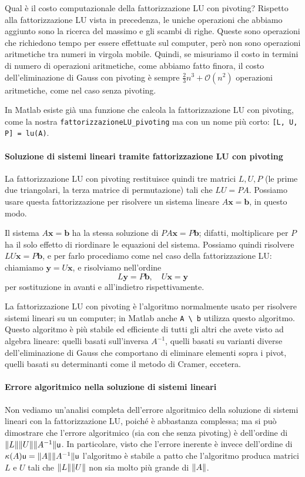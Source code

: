 \documentclass[a4paper]{report}
\DeclarePairedDelimiter{\norm}{\lVert}{\rVert}
\theoremstyle{definition}
\theoremstyle{remark}
\newcommand{\x}{\mathbf{x}}
\renewcommand{\b}{\mathbf{b}}
\begin{document}
Qual è il costo computazionale della fattorizzazione LU con pivoting? Rispetto alla fattorizzazione LU vista in precedenza, le uniche operazioni che abbiamo aggiunto sono la ricerca del massimo e gli scambi di righe. Queste sono operazioni che richiedono tempo per essere effettuate sul computer, però non sono operazioni aritmetiche tra numeri in virgola mobile. Quindi, se misuriamo il costo in termini di numero di operazioni aritmetiche, come abbiamo fatto finora, il costo dell'eliminazione di Gauss con pivoting è sempre $\frac23 n^3 + \mathcal{O}(n^2)$ operazioni aritmetiche, come nel caso senza pivoting.

In Matlab esiste già una funzione che calcola la fattorizzazione LU con pivoting, come la nostra \lstinline{fattorizzazioneLU_pivoting} ma con un nome più corto: \lstinline{[L, U, P] = lu(A)}.


\paragraph{Soluzione di sistemi lineari tramite fattorizzazione LU con pivoting}

La fattorizzazione LU con pivoting restituisce quindi tre matrici $L,U,P$ (le prime due triangolari, la terza matrice di permutazione) tali che $LU = PA$. Possiamo usare questa fattorizzazione per risolvere un sistema lineare $A\x=\b$, in questo modo.

Il sistema $A\x = \b$ ha la stessa soluzione di $PA\x = P\b$; difatti, moltiplicare per $P$ ha il solo effetto di riordinare le equazioni del sistema. Possiamo quindi risolvere $LU\x=P\b$, e per farlo procediamo come nel caso della fattorizzazione LU: chiamiamo $\mathbf{y}=U\x$, e risolviamo nell'ordine
\[
L\mathbf{y} = P\b, \quad U\x = \mathbf{y}
\]
per sostituzione in avanti e all'indietro rispettivamente.

La fattorizzazione LU con pivoting è l'algoritmo normalmente usato per risolvere sistemi lineari su un computer; in Matlab 
anche \lstinline{A \ b} utilizza questo algoritmo. Questo algoritmo è più stabile ed efficiente di tutti gli altri che avete visto ad algebra lineare: quelli basati sull'inversa $A^{-1}$, quelli basati su varianti diverse dell'eliminazione di Gauss che comportano di eliminare elementi sopra i pivot, quelli basati su determinanti come il metodo di Cramer, eccetera.

\paragraph{Errore algoritmico nella soluzione di sistemi lineari}
Non vediamo un'analisi completa dell'errore algoritmico della soluzione di sistemi lineari con la fattorizzazione LU, poiché è abbastanza complessa; ma si può dimostrare che l'errore algoritmico (sia con che senza pivoting) è dell'ordine di $\norm{L}\norm{U} \norm{A^{-1}} \mathsf{u}$. In particolare, visto che l'errore inerente è invece dell'ordine di $\kappa(A)\mathsf{u} = \norm{A}\norm{A^{-1}}\mathsf{u}$  l'algoritmo è stabile a patto che l'algoritmo produca matrici $L$ e $U$ tali che $\norm{L}\norm{U}$ non sia molto più grande di $\norm{A}$.
\end{document}
